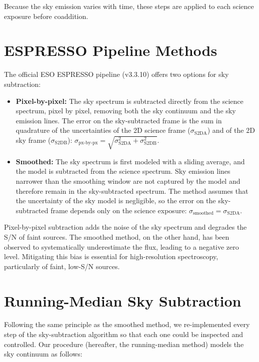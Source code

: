 \documentclass[11pt,twoside]{article}
\begin{document}
\noindent Because the sky emission varies with time, these steps are applied to each science exposure before coaddition.

\section{ESPRESSO Pipeline Methods}
The official ESO ESPRESSO pipeline (v3.3.10) offers two options for sky subtraction:

\begin{itemize}
    \item \textbf{Pixel-by-pixel:} The sky spectrum is subtracted directly from the science spectrum, pixel by pixel, removing both the sky continuum and the sky emission lines. The error on the sky-subtracted frame is the sum in quadrature of the uncertainties of the 2D science frame ($\sigma_{\mathrm{S2DA}}$) and of the 2D sky frame ($\sigma_{\mathrm{S2DB}}$):
    $\sigma_{\mathrm{px\mbox{-}by\mbox{-}px}} = \sqrt{\sigma_{\mathrm{S2DA}}^2 + \sigma_{\mathrm{S2DB}}^2}.$

    \item \textbf{Smoothed:} The sky spectrum is first modeled with a sliding average, and the model is subtracted from the science spectrum. Sky emission lines narrower than the smoothing window are not captured by the model and therefore remain in the sky-subtracted spectrum. The method assumes that the uncertainty of the sky model is negligible, so the error on the sky-subtracted frame depends only on the science exposure: $\sigma_{\mathrm{smoothed}} = \sigma_{\mathrm{S2DA}}$.
\end{itemize}

\noindent Pixel-by-pixel subtraction adds the noise of the sky spectrum and degrades the S/N of faint sources. The smoothed method, on the other hand, has been observed to systematically underestimate the flux, leading to a negative zero level. Mitigating this bias is essential for high-resolution spectroscopy, particularly of faint, low-S/N sources.

\section{Running-Median Sky Subtraction}
Following the same principle as the smoothed method, we re-implemented every step of the sky-subtraction algorithm so that each one could be inspected and controlled. Our procedure (hereafter, the running-median method) models the sky continuum as follows:
\end{document}
